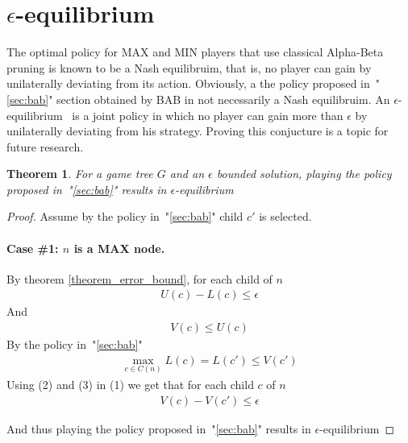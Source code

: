 \documentclass[letterpaper]{article} %
\newcounter{bab}
\newtheorem{theorem}{Theorem}
\newcommand{\MM}{\mathit{V}}
\newcommand{\pess}{\mathit{L}}
\newcommand{\opti}{\mathit{U}}
\begin{document}
\section{$\epsilon$-equilibrium}
The optimal policy for MAX and MIN players that use classical Alpha-Beta pruning is known to be a Nash equilibruim, that is, no player can gain by unilaterally deviating from its action. Obviously, a the policy proposed in~"\ref{sec:bab}" section obtained by BAB in not necessarily a Nash equilibruim. An  $\epsilon$-equilibrium~\cite{nisan2007algorithmic} is a joint policy in which no player can gain more than $\epsilon$ by unilaterally deviating from his strategy. Proving this conjucture is a topic for future research.

\begin{theorem}
For a game tree $G$ and an $\epsilon$ bounded solution, playing the policy proposed in~"\ref{sec:bab}" results in $\epsilon$-equilibrium
\end{theorem}
\begin{proof}

Assume by the policy in~"\ref{sec:bab}" child $c'$ is selected.

\paragraph{Case \#1: $n$ is a MAX node.}
By theorem \ref{theorem_error_bound}, for each child of $n$
\begin{align}
    \opti(c) - \pess(c) \leq \epsilon
\end{align}
And
\begin{align}
   \MM(c) \leq \opti(c)
\end{align}
By the policy in~"\ref{sec:bab}"
\begin{align}
    \max\limits_{c\in C(n)} \pess(c) =  L(c') \leq \MM(c')
\end{align}
Using (2) and (3) in (1) we get that for each child $c$ of $n$
\begin{align}
    \MM(c) - \MM(c') \leq \epsilon
\end{align}

And thus playing the policy proposed in~"\ref{sec:bab}" results in $\epsilon$-equilibrium
\end{proof}
\end{document}
